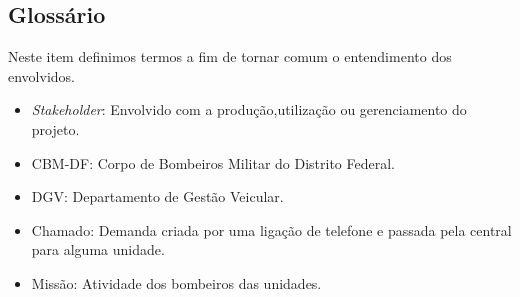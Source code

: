 \begin{apendicesenv}
		\subsection{Glossário}
Neste item definimos termos a fim de tornar comum o entendimento dos envolvidos.
\begin{itemize}
 \item \textit{Stakeholder}: Envolvido com a produção,utilização ou gerenciamento do projeto.
 \item CBM-DF: Corpo de Bombeiros Militar do Distrito Federal.
 \item DGV: Departamento de Gestão Veicular.
 \item Chamado: Demanda criada por uma ligação de telefone e passada pela central para alguma unidade.
 \item Missão: Atividade dos bombeiros das unidades.
\end{itemize}
\end{apendicesenv}
